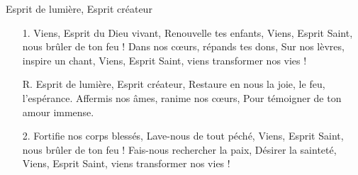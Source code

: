 Esprit de lumière, Esprit créateur
\begin{itemize}
\item[1.]
Viens, Esprit du Dieu vivant,
Renouvelle tes enfants,
Viens, Esprit Saint, nous brûler de ton feu !
Dans nos cœurs, répands tes dons,
Sur nos lèvres, inspire un chant,
Viens, Esprit Saint, viens transformer nos vies !
\item[R.]
Esprit de lumière, Esprit créateur,
Restaure en nous la joie, le feu, l’espérance.
Affermis nos âmes, ranime nos cœurs,
Pour témoigner de ton amour immense.
\item[2.]
Fortifie nos corps blessés,
Lave-nous de tout péché,
Viens, Esprit Saint, nous brûler de ton feu !
Fais-nous rechercher la paix,
Désirer la sainteté,
Viens, Esprit Saint, viens transformer nos vies !
\end{itemize}
